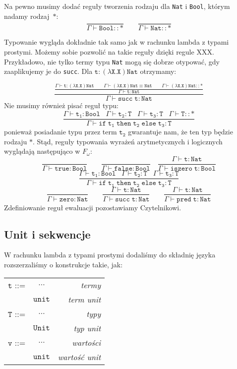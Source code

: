 \documentclass[11pt,leqno]{article}
\begin{document}
Na pewno musimy dodać reguły tworzenia rodzaju dla \texttt{Nat} i \texttt{Bool}, którym nadamy rodzaj~$\mathtt{\ast}$:
 	\[\mathtt{ \frac{}{\Gamma \vdash Bool::\ast} \qquad \frac{}{\Gamma \vdash Nat::\ast}
		}
	\]

Typowanie wygląda dokładnie tak samo jak w rachunku lambda z typami prostymi. Możemy sobie pozwolić na takie reguły dzięki regule XXX.
Przykładowo, nie tylko termy typu \texttt{Nat} mogą się dobrze otypować, gdy zaaplikujemy je do \texttt{succ}. Dla $\mathtt{t:(\lambda X.X)Nat}$
otrzymamy:

 	\[\mathtt{ \frac{\frac{\Gamma \vdash t:(\lambda X.X)Nat\hspace{2em}\Gamma \vdash (\lambda X.X)Nat \equiv Nat \hspace{2em}\Gamma \vdash (\lambda X.X)Nat::\ast}{\Gamma \vdash t:Nat}}{\Gamma \vdash succ\;t:Nat} 
		}
	\]
Nie musimy również pisać reguł typu:~\[\mathtt{\frac{\Gamma \vdash t_1:Bool \;\;\; \Gamma \vdash t_2:T \;\;\; \Gamma \vdash t_3:T\;\;\; \Gamma \vdash T::\ast}{\Gamma \vdash if\;t_1\;then\;t_2\;else\;t_3:T} 
		}
	\]
ponieważ posiadanie typu przez term $\mathtt{t_2}$ gwarantuje nam, że ten typ będzie rodzaju $\mathtt{\ast}$.
Stąd, reguły typowania wyrażeń arytmetycznych i logicznych wyglądają następująco w $F_\omega$:~\[\mathtt{ \frac{}{\Gamma \vdash true:Bool} \qquad \frac{}{\Gamma \vdash false:Bool} \quad \frac{\Gamma \vdash t:Nat}{\Gamma \vdash iszero\;t:Bool}
		}
	\]
 	\[\mathtt{\frac{\Gamma \vdash t_1:Bool \;\;\; \Gamma \vdash t_2:T \;\;\; \Gamma \vdash t_3:T}{\Gamma \vdash if\;t_1\;then\;t_2\;else\;t_3:T} 
		}
	\]
 	\[\mathtt{ \frac{}{\Gamma \vdash zero:Nat} \qquad \frac{\Gamma \vdash t:Nat}{\Gamma \vdash succ\;t:Nat} \qquad \frac{\Gamma \vdash t:Nat}{\Gamma \vdash pred\;t:Nat} 
		}
	\]
Zdefiniowanie reguł ewaluacji pozostawiamy Czytelnikowi.

\subsection{Unit i sekwencje}

W rachunku lambda z typami prostymi dodaliśmy do składnię języka rozszerzaliśmy o konstrukcje takie, jak: 

\begin{tabular}{| l c r |}
  \hline
  $\mathtt{t}$ ::= & $\dots$ & \textit{termy}  \\
   & $\mathtt{unit}$ & \textit{term unit} \\
  $\mathtt{T}$ ::= & $\dots$ & \textit{typy}  \\
   & $\mathtt{Unit}$ & \textit{typ unit} \\
  $\mathtt{v}$ ::= & $\dots$ & \textit{wartości}  \\
   & $\mathtt{unit}$ & \textit{wartość unit} \\
  \hline
\end{tabular} \\
\end{document}
